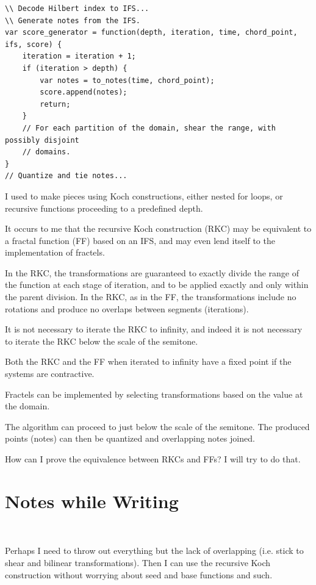 \documentclass[english,11pt,letterpaper,onecolumn]{scrartcl}
\numberwithin{equation}{section}
\begin{document}
\begin{lstlisting}
\\ Decode Hilbert index to IFS...
\\ Generate notes from the IFS.
var score_generator = function(depth, iteration, time, chord_point, ifs, score) {
    iteration = iteration + 1;
    if (iteration > depth) {
        var notes = to_notes(time, chord_point);
        score.append(notes);
        return;
    }
    // For each partition of the domain, shear the range, with possibly disjoint
    // domains.
}
// Quantize and tie notes...
\end{lstlisting}

I used to make pieces using Koch constructions, either nested for loops, or recursive
functions proceeding to a predefined depth.

It occurs to me that the recursive Koch construction (RKC) may be equivalent to a
fractal function (FF) based on an IFS, and may even lend itself to the implementation
of fractels.

In the RKC, the transformations are guaranteed to exactly divide the range of the
function at each stage of iteration, and to be applied exactly and only within the
parent division. In the RKC, as in the FF, the transformations include no rotations and
produce no overlaps between segments (iterations).

It is not necessary to iterate the RKC to infinity, and indeed it is not necessary to
iterate the RKC below the scale of the semitone.

Both the RKC and the FF when iterated to infinity have a fixed point if the systems are
contractive.

Fractels can be implemented by selecting transformations based on the value at the domain.

The algorithm can proceed to just below the scale of the semitone. The produced points
(notes) can then be quantized and overlapping notes joined.

How can I prove the equivalence between RKCs and FFs? I will try to do that.

\section{Notes while Writing}\

Perhaps I need to throw out everything but the lack of overlapping (i.e. stick
to shear and bilinear transformations). Then I can use the recursive Koch
construction without worrying about seed and base functions and such.
\end{document}
